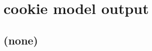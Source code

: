 
\cleardoublepage


\chapter{cookie model output}\label{ch:model-output}

\hfill \break

\newpage

\section{(none)}

